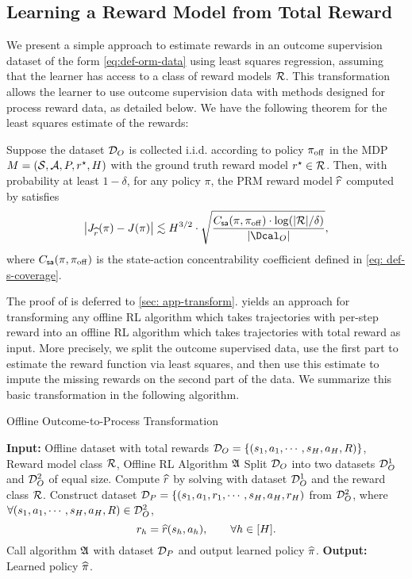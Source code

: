 \documentclass{article}
\begin{document}
\subsection{Learning a Reward Model from Total Reward}\label{sec: transform}




We present a simple approach to estimate rewards in an outcome supervision dataset of the form \cref{eq:def-orm-data} using least squares regression, assuming that the learner has access to a class of reward models $\mathcal{R}$. This transformation allows the learner to use outcome supervision data with methods designed for process reward data, as detailed below. 
We have the following theorem for the least squares estimate of the rewards:
\begin{theorem}\label{thm: orm-prm-transformation}
    Suppose the dataset $\mathcal{D}_O$ is collected i.i.d. according to policy $\pi_{\mathrm{off}}$ in the MDP $M = (\mathcal{S}, \mathcal{A}, P, r^\star, H)$ with the ground truth reward model $r^\star\in \mathcal{R}$. Then, with probability at least $1 - \delta$, for any policy $\pi$, 
    the PRM reward model $\widehat{r}$ computed by  satisfies 
    \[
    \left|J_{\hr}(\pi) - J(\pi)\right|\lesssim H^{3/2}\cdot \sqrt{\frac{\Cs(\pi, \pioff)\cdot \log(|\calR|/\delta)}{|\Dcal_O|}},
    \]
    where $C_{\mathsf{sa}}(\pi, \pi_{\mathrm{off}})$ is the state-action concentrability coefficient defined in \cref{eq: def-s-coverage}.
\end{theorem}
The proof of  is deferred to \cref{sec: app-transform}.  yields an approach for transforming any offline RL algorithm which takes trajectories with per-step reward into an offline RL algorithm which takes trajectories with total reward as input. More precisely, we split the outcome supervised data, use the first part to estimate the reward function via least squares, and then use this estimate to impute the missing rewards on the second part of the data. We summarize this basic transformation in the following algorithm.

\begin{algorithm}
    \caption{Offline Outcome-to-Process Transformation}\label{alg:transfomration-2}
    \begin{algorithmic}[1]
        \State\textbf{Input: } Offline dataset with total rewards $\mathcal{D}_O = \{(s_1, a_1, \cdots, s_H, a_H, R)\}$, 
        Reward model class $\mathcal{R}$, Offline RL Algorithm $\mathfrak{A}$%
        \State Split $\mathcal{D}_O$ into two datasets $\mathcal{D}_{O}^1$ and $\mathcal{D}_{O}^2$ of equal size. 
        \State Compute $\widehat{r}$ by solving  with dataset $\mathcal{D}_O^1$ and the reward class $\mathcal{R}$.
        \State Construct dataset $\mathcal{D}_P = \{(s_1, a_1, r_1, \cdots, s_H, a_H, r_H)$ from $\mathcal{D}_O^2$, where $\forall (s_1, a_1, \cdots, s_H, a_H, R)\in \mathcal{D}_O^2$,
        $$r_h = \widehat{r}(s_h, a_h),\qquad \forall h\in [H].$$
        \State Call algorithm $\mathfrak{A}$ with dataset $\mathcal{D}_P$ and output learned policy $\widehat{\pi}$.
        \State \textbf{Output: } Learned policy $\widehat{\pi}$.
    \end{algorithmic}
\end{algorithm}
\end{document}
